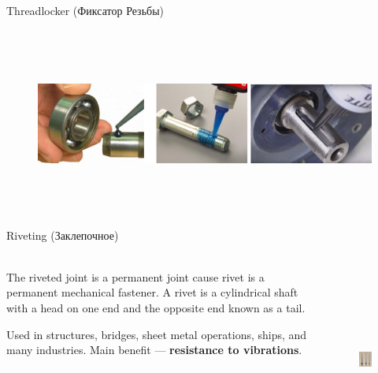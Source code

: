 \documentclass[aspectratio=169]{beamer}
\begin{document}
\begin{frame}[c]{Threadlocker (Фиксатор Резьбы)}
    \framesubtitle{}
    \vspace{-0.6cm}
    \begin{figure}[H]
        \centering\includegraphics[height=6cm,width=1\textwidth,keepaspectratio]{threadlocker.png}
        \label{fig:threadlocker.png}
    \end{figure}
\end{frame}

\begin{frame}[t]{Riveting (Заклепочное)}
    \framesubtitle{}
    \begin{columns}[T,onlytextwidth]
        \begin{column}{0.49\textwidth}
            The riveted joint is a permanent joint cause rivet is a permanent mechanical fastener. A rivet is a cylindrical shaft with a head on one end and the opposite end known as a tail.
            \medskip

            Used in structures, bridges, sheet metal operations, ships, and many industries. Main benefit --- \textbf{resistance to vibrations}.
        \end{column}
        \begin{column}{0.49\textwidth}
            \vspace{-1cm}
            \begin{figure}[H]
                \centering\includegraphics[height=6cm,width=1\textwidth,keepaspectratio]{rivetrivet.jpg}
                \label{fig:rivetrivet.jpg}
            \end{figure}
        \end{column}
    \end{columns}
\end{frame}
\end{document}
